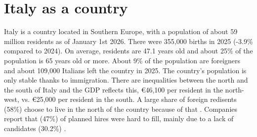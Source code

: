 \section{Italy as a country}
Italy is a country located in Southern Europe, with a population of about 59 million residents as of January 1st 2026. There were 355,000 births in 2025 (-3.9\% compared to 2024). On average, residents are 47.1 years old and about 25\% of the population is 65 years old or more. About 9\% of the population are foreigners and about 109,000 Italians left the country in 2025. The country's population is only stable thanks to immigration. There are inequalities between the north and the south of Italy and the GDP reflects this, \euro{46,100} per resident in the north-west, vs. \euro{25,000} per resident in the south. A large share of foreign redisents (58\%) choose to live in the north of the country because of that \parencite{istat-demo-ind, istat-gpd}. Companies report that (47\%) of planned hires were hard to fill, mainly due to a lack of candidates (30.2\%) \parencite{camcom-diff-hiring}.
